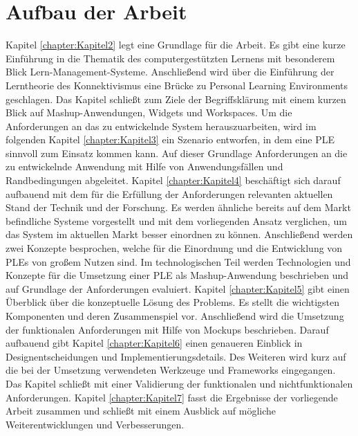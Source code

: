 \section{Aufbau der Arbeit}
Kapitel \ref{chapter:Kapitel2} legt eine Grundlage für die Arbeit. Es gibt eine kurze Einführung in die Thematik des computergestützten Lernens mit besonderem Blick Lern-Management-Systeme. Anschließend wird über die Einführung der Lerntheorie des Konnektivismus eine Brücke zu Personal Learning Environments geschlagen. Das Kapitel schließt zum Ziele der Begriffsklärung mit einem kurzen Blick auf Mashup-Anwendungen, Widgets und Workspaces. Um die Anforderungen an das zu entwickelnde System herauszuarbeiten, wird im folgenden Kapitel \ref{chapter:Kapitel3} ein Szenario entworfen, in dem eine \ac{PLE} sinnvoll zum Einsatz kommen kann. Auf dieser Grundlage Anforderungen an die zu entwickelnde Anwendung mit Hilfe von Anwendungsfällen und Randbedingungen abgeleitet. Kapitel \ref{chapter:Kapitel4} beschäftigt sich darauf aufbauend mit dem für die Erfüllung der Anforderungen relevanten aktuellen Stand der Technik und der Forschung. Es werden ähnliche bereits auf dem Markt befindliche Systeme vorgestellt und mit dem vorliegenden Ansatz verglichen, um das System im aktuellen Markt besser einordnen zu können. Anschließend werden zwei Konzepte besprochen, welche für die Einordnung und die Entwicklung von \acp{PLE} von großem Nutzen sind. Im technologischen Teil werden Technologien und Konzepte für die Umsetzung einer \ac{PLE} als Mashup-Anwendung beschrieben und auf Grundlage der Anforderungen evaluiert. Kapitel \ref{chapter:Kapitel5} gibt einen Überblick über die konzeptuelle Lösung des Problems. Es stellt die wichtigsten Komponenten und deren Zusammenspiel vor. Anschließend wird die Umsetzung der funktionalen Anforderungen mit Hilfe von Mockups beschrieben. Darauf aufbauend gibt Kapitel \ref{chapter:Kapitel6} einen genaueren Einblick in Designentscheidungen und Implementierungsdetails. Des Weiteren wird kurz auf die bei der Umsetzung verwendeten Werkzeuge und Frameworks eingegangen. Das Kapitel schließt mit einer Validierung der funktionalen und nichtfunktionalen Anforderungen. Kapitel \ref{chapter:Kapitel7} fasst die Ergebnisse der vorliegende Arbeit zusammen und schließt mit einem Ausblick auf mögliche Weiterentwicklungen und Verbesserungen.


